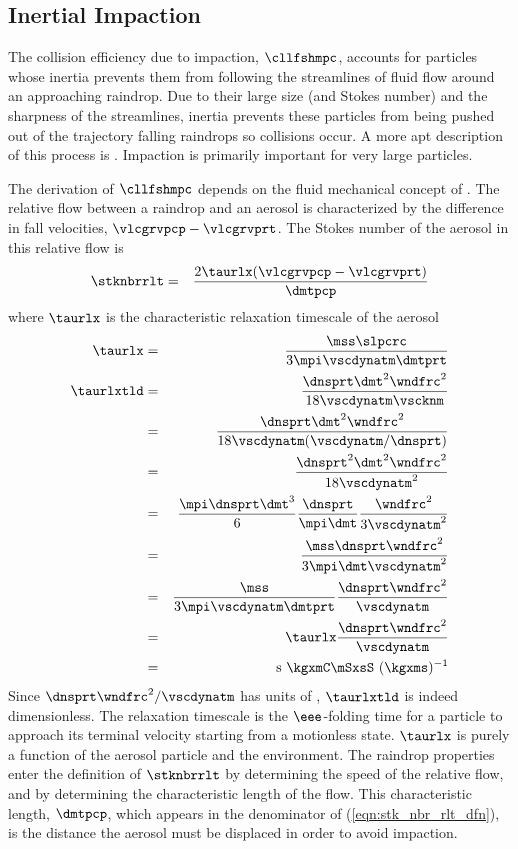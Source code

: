 \documentclass[12pt,twoside]{book}
\begin{document}
\subsection[Inertial Impaction]{Inertial Impaction}\label{sxn:mpc}
The collision efficiency due to impaction, $\cllfshmpc$,
accounts for particles whose inertia prevents them from following the
streamlines of fluid flow around an approaching raindrop.
Due to their large size (and Stokes number) and the sharpness
of the streamlines, inertia prevents these particles from being pushed
out of the trajectory falling raindrops so collisions occur. 
A more apt description of this process is .
Impaction is primarily important for very large particles.

The derivation of $\cllfshmpc$ depends on the fluid mechanical concept
of .
The relative flow between a raindrop and an aerosol is characterized
by the difference in fall velocities, $\vlcgrvpcp - \vlcgrvprt$.
The Stokes number of the aerosol in this relative flow is
\begin{eqnarray}
\stknbrrlt & = & \frac{2 \taurlx ( \vlcgrvpcp - \vlcgrvprt )}{\dmtpcp }
\label{eqn:stk_nbr_rlt_dfn}
\end{eqnarray}
where $\taurlx$ is the characteristic relaxation timescale of the
aerosol 
\begin{eqnarray}
\taurlx & = & \frac{\mss \slpcrc}{3 \mpi \vscdynatm \dmtprt } \\
\taurlxtld & = & \frac{\dnsprt \dmt^{2} \wndfrc^{2}}{18 \vscdynatm \vscknm } \nonumber \\
& = & \frac{\dnsprt \dmt^{2} \wndfrc^{2}}{18 \vscdynatm
( \vscdynatm / \dnsprt ) } \nonumber \\
& = & \frac{\dnsprt^{2} \dmt^{2} \wndfrc^{2}}{18 \vscdynatm^{2} } \nonumber \\
& = & \frac{\mpi \dnsprt \dmt^{3}}{6} \frac{\dnsprt}{\mpi \dmt } 
\frac{\wndfrc^{2}}{3 \vscdynatm^{2} } \nonumber \\
& = & \frac{\mss \dnsprt \wndfrc^{2}}{3 \mpi \dmt \vscdynatm^{2} } \nonumber \\
& = & \frac{\mss}{3 \mpi \vscdynatm \dmtprt } 
\frac{\dnsprt \wndfrc^{2}}{\vscdynatm } \nonumber \\
& = & \taurlx \frac{\dnsprt \wndfrc^{2}}{\vscdynatm } \\
& = & \mbox{s} \ \mbox{\kgxmC} \mbox{\mSxsS} \ ( \mbox{\kgxms} )^{-1}\nonumber
\label{eqn:tau_rlx_dfn}
\end{eqnarray}
Since $\dnsprt \wndfrc^{2} / \vscdynatm$ has units of \xs, $\taurlxtld$
is indeed dimensionless.
The relaxation timescale is the $\eee$-folding time for a particle to
approach its terminal velocity starting from a motionless state.
$\taurlx$ is purely a function of the aerosol particle and the
environment. 
The raindrop properties enter the definition of $\stknbrrlt$ by
determining the speed of the relative flow, and by determining the
characteristic length of the flow.
This characteristic length, $\dmtpcp$, which appears in the
denominator of (\ref{eqn:stk_nbr_rlt_dfn}), is the distance
the aerosol must be displaced in order to avoid impaction.
\end{document}
